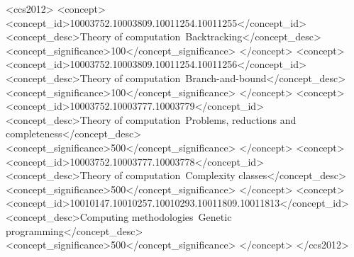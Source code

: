 \documentclass[sigconf]{acmart}
\begin{document}

\begin{CCSXML}
<ccs2012>
   <concept>
       <concept_id>10003752.10003809.10011254.10011255</concept_id>
       <concept_desc>Theory of computation~Backtracking</concept_desc>
       <concept_significance>100</concept_significance>
       </concept>
   <concept>
       <concept_id>10003752.10003809.10011254.10011256</concept_id>
       <concept_desc>Theory of computation~Branch-and-bound</concept_desc>
       <concept_significance>100</concept_significance>
       </concept>
   <concept>
       <concept_id>10003752.10003777.10003779</concept_id>
       <concept_desc>Theory of computation~Problems, reductions and completeness</concept_desc>
       <concept_significance>500</concept_significance>
       </concept>
   <concept>
       <concept_id>10003752.10003777.10003778</concept_id>
       <concept_desc>Theory of computation~Complexity classes</concept_desc>
       <concept_significance>500</concept_significance>
       </concept>
   <concept>
       <concept_id>10010147.10010257.10010293.10011809.10011813</concept_id>
       <concept_desc>Computing methodologies~Genetic programming</concept_desc>
       <concept_significance>500</concept_significance>
       </concept>
 </ccs2012>
\end{CCSXML}



\end{document}

